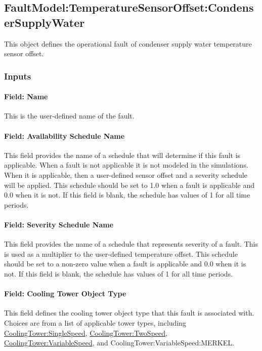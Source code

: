 \subsection{FaultModel:TemperatureSensorOffset:CondenserSupplyWater}\label{faultmodeltemperaturesensoroffsetcondensersupplywater}

This object defines the operational fault of condenser supply water temperature sensor offset.

\subsubsection{Inputs}

\paragraph{Field: Name}

This is the user-defined name of the fault.

\paragraph{Field: Availability Schedule Name}

This field provides the name of a schedule that will determine if this fault is applicable. When a fault is not applicable it is not modeled in the simulations. When it is applicable, then a user-defined sensor offset and a severity schedule will be applied. This schedule should be set to 1.0 when a fault is applicable and 0.0 when it is not. If this field is blank, the schedule has values of 1 for all time periods.

\paragraph{Field: Severity Schedule Name}

This field provides the name of a schedule that represents severity of a fault. This is used as a multiplier to the user-defined temperature offset. This schedule should be set to a non-zero value when a fault is applicable and 0.0 when it is not. If this field is blank, the schedule has values of 1 for all time periods.

\paragraph{Field: Cooling Tower Object Type}

This field defines the cooling tower object type that this fault is associated with. Choices are from a list of applicable tower types, including \hyperref[coolingtowersinglespeed]{CoolingTower:SingleSpeed}, \hyperref[coolingtowertwospeed]{CoolingTower:TwoSpeed}, \hyperref[coolingtowervariablespeed]{CoolingTower:VariableSpeed}, and CoolingTower:VariableSpeed:MERKEL.

